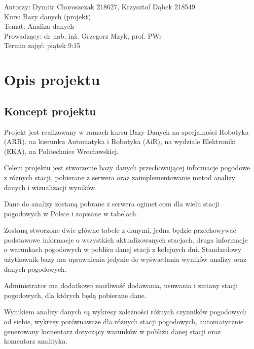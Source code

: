 \documentclass[12pt,a4paper]{article}
\begin{document}
\vspace{20pt}
 
\begin{flushleft}
Autorzy: Dymitr Choroszczak 218627, Krzysztof Dąbek 218549\\
Kurs: Bazy danych (projekt)\\
Temat: Analiza danych\\
Prowadzący: dr hab. inż. Grzegorz Mzyk, prof. PWr\\
Termin zajęć: piątek 9:15\\
\end{flushleft} 
 
\newpage
 
\tableofcontents
 
\newpage
 
\section{Opis projektu}
 
\subsection{Koncept projektu}
\normalsize
Projekt jest realizowany w ramach kursu Bazy Danych na specjalności Robotyka (ARR), na kierunku Automatyka i Robotyka (AiR), na wydziale Elektroniki (EKA), na Politechnice Wrocławskiej.\par
Celem projektu jest stworzenie bazy danych przechowującej informacje pogodowe z różnych stacji, pobierane z serwera oraz zaimplementowanie metod analizy danych i wizualizacji wyników.\par
Dane do analizy zostaną pobrane z serwera ogimet.com dla wielu stacji pogodowych w Polsce i zapisane w tabelach.\par
Zostaną stworzone dwie główne tabele z danymi, jedna będzie przechowywać podstawowe informacje o wszystkich aktualizowanych stacjach, druga informacje o warunkach pogodowych w pobliżu danej stacji z kolejnych dni.
Standardowy użytkownik bazy ma uprawnienia jedynie do wyświetlania wyników analizy oraz danych pogodowych.\par
Administrator ma dodatkowo możliwość dodawania, usuwania i zmiany stacji pogodowych, dla których będą pobierane dane.\par
Wynikiem analizy danych są wykresy zależności różnych czynników pogodowych od siebie, wykresy porównawcze dla różnych stacji pogodowych, automatycznie generowany komentarz dotyczący warunków w pobliżu danej stacji oraz komentarz analityka.
\end{document}

